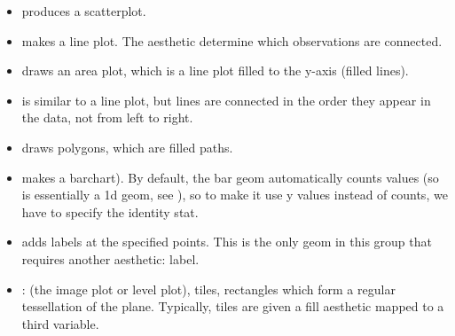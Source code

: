 \begin{itemize}
  \item {} produces a scatterplot.

  \item {} makes a line plot.  The  aesthetic determine which observations are connected.

  \item {} draws an area plot, which is a line plot filled to the y-axis (filled lines).

  \item {} is similar to a line plot, but lines are connected in the order they appear in the data, not from left to right.  

  \item {} draws polygons, which are filled paths.

  \item {} makes a barchart).  By default, the bar geom automatically counts values (so is essentially a 1d geom, see ), so to make it use y values instead of counts, we have to specify the identity stat.

  \item {} adds labels at the specified points.  This is the only geom in this group that requires another aesthetic: label.

  \item {}: (the image plot or level plot), tiles, rectangles which form a regular tessellation of the plane.  Typically, tiles are given a fill aesthetic mapped to a third variable.
\end{itemize}

% 


